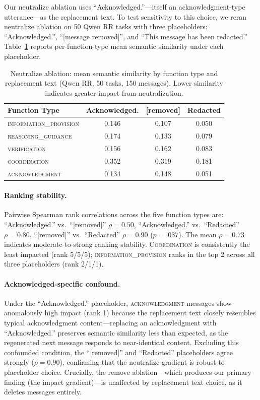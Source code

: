 Our neutralize ablation uses ``Acknowledged.''---itself an acknowledgment-type utterance---as the replacement text. To test sensitivity to this choice, we reran neutralize ablation on 50 Qwen RR tasks with three placeholders: ``Acknowledged.'', ``{[message removed]}'', and ``This message has been redacted.'' Table~\ref{tab:placeholder_sensitivity} reports per-function-type mean semantic similarity under each placeholder.

\begin{table}[htbp]
\centering
\caption{Neutralize ablation: mean semantic similarity by function type and replacement text (Qwen RR, 50 tasks, 150 messages). Lower similarity indicates greater impact from neutralization.}
\label{tab:placeholder_sensitivity}
\small
\begin{tabular}{lccc}
\toprule
\textbf{Function Type} & \textbf{Acknowledged.} & \textbf{[removed]} & \textbf{Redacted} \\
\midrule
\textsc{information\_provision} & 0.146 & 0.107 & 0.050 \\
\textsc{reasoning\_guidance}    & 0.174 & 0.133 & 0.079 \\
\textsc{verification}           & 0.156 & 0.162 & 0.083 \\
\textsc{coordination}           & 0.352 & 0.319 & 0.181 \\
\textsc{acknowledgment}         & 0.134 & 0.148 & 0.051 \\
\bottomrule
\end{tabular}
\end{table}

\paragraph{Ranking stability.} Pairwise Spearman rank correlations across the five function types are: ``Acknowledged.'' vs.\ ``{[removed]}'' $\rho = 0.50$, ``Acknowledged.'' vs.\ ``Redacted'' $\rho = 0.80$, ``{[removed]}'' vs.\ ``Redacted'' $\rho = 0.90$ ($p = .037$). The mean $\rho = 0.73$ indicates moderate-to-strong ranking stability. \textsc{Coordination} is consistently the least impacted (rank 5/5/5); \textsc{information\_provision} ranks in the top 2 across all three placeholders (rank 2/1/1).

\paragraph{Acknowledged-specific confound.} Under the ``Acknowledged.'' placeholder, \textsc{acknowledgment} messages show anomalously high impact (rank 1) because the replacement text closely resembles typical acknowledgment content---replacing an acknowledgment with ``Acknowledged.'' preserves semantic similarity less than expected, as the regenerated next message responds to near-identical content. Excluding this confounded condition, the ``{[removed]}'' and ``Redacted'' placeholders agree strongly ($\rho = 0.90$), confirming that the neutralize gradient is robust to placeholder choice. Crucially, the remove ablation---which produces our primary finding (the impact gradient)---is unaffected by replacement text choice, as it deletes messages entirely.

